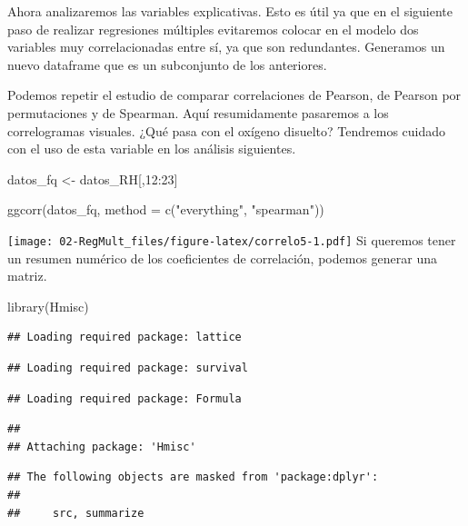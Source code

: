 \documentclass[
]{book}
\newenvironment{Shaded}{\begin{snugshade}}{\end{snugshade}}
\newcommand{\AttributeTok}[1]{\textcolor[rgb]{0.77,0.63,0.00}{#1}}
\newcommand{\DecValTok}[1]{\textcolor[rgb]{0.00,0.00,0.81}{#1}}
\newcommand{\FunctionTok}[1]{\textcolor[rgb]{0.00,0.00,0.00}{#1}}
\newcommand{\NormalTok}[1]{#1}
\newcommand{\OtherTok}[1]{\textcolor[rgb]{0.56,0.35,0.01}{#1}}
\newcommand{\SpecialCharTok}[1]{\textcolor[rgb]{0.00,0.00,0.00}{#1}}
\newcommand{\StringTok}[1]{\textcolor[rgb]{0.31,0.60,0.02}{#1}}
\begin{document}
Ahora analizaremos las variables explicativas. Esto es útil ya que en el siguiente paso de realizar regresiones múltiples evitaremos colocar en el modelo dos variables muy correlacionadas entre sí, ya que son redundantes. Generamos un nuevo dataframe que es un subconjunto de los anteriores.

Podemos repetir el estudio de comparar correlaciones de Pearson, de Pearson por permutaciones y de Spearman. Aquí resumidamente pasaremos a los correlogramas visuales. ¿Qué pasa con el oxígeno disuelto? Tendremos cuidado con el uso de esta variable en los análisis siguientes.

\begin{Shaded}
\begin{Highlighting}[]
\NormalTok{datos\_fq }\OtherTok{\textless{}{-}}\NormalTok{ datos\_RH[,}\DecValTok{12}\SpecialCharTok{:}\DecValTok{23}\NormalTok{]}

\FunctionTok{ggcorr}\NormalTok{(datos\_fq, }\AttributeTok{method =} \FunctionTok{c}\NormalTok{(}\StringTok{"everything"}\NormalTok{, }\StringTok{"spearman"}\NormalTok{)) }
\end{Highlighting}
\end{Shaded}

\texttt{[image: 02-RegMult\_files/figure-latex/correlo5-1.pdf]}
Si queremos tener un resumen numérico de los coeficientes de correlación, podemos generar una matriz.

\begin{Shaded}
\begin{Highlighting}[]
\FunctionTok{library}\NormalTok{(Hmisc)}
\end{Highlighting}
\end{Shaded}

\begin{verbatim}
## Loading required package: lattice
\end{verbatim}

\begin{verbatim}
## Loading required package: survival
\end{verbatim}

\begin{verbatim}
## Loading required package: Formula
\end{verbatim}

\begin{verbatim}
## 
## Attaching package: 'Hmisc'
\end{verbatim}

\begin{verbatim}
## The following objects are masked from 'package:dplyr':
## 
##     src, summarize
\end{verbatim}
\end{document}
